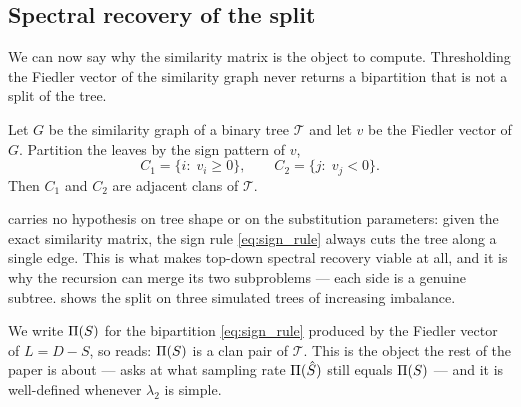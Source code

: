 \subsection{Spectral recovery of the split}\label{sec:model-recovery}

We can now say why the similarity matrix is the object to compute. Thresholding the
Fiedler vector of the similarity graph never returns a bipartition that is not a
split of the tree.

\begin{theorem}\label{thm:stdr-split}
Let $G$ be the similarity graph of a binary tree $\mathcal{T}$ and let $v$ be the
Fiedler vector of $G$. Partition the leaves by the sign pattern of $v$,
\begin{equation}\label{eq:sign_rule}
   C_1=\{i:\;v_i\ge0\},\qquad C_2=\{j:\;v_j<0\}.
\end{equation}
Then $C_1$ and $C_2$ are adjacent clans of $\mathcal{T}$.
\end{theorem}

\noindent {} carries no hypothesis on tree shape or on the
substitution parameters: given the exact similarity matrix, the sign rule
\eqref{eq:sign_rule} always cuts the tree along a single edge. This is what makes
top-down spectral recovery viable at all, and it is why the recursion can merge its
two subproblems --- each side is a genuine subtree.  shows
the split on three simulated trees of increasing imbalance.

We write $\Pi(S)$ for the bipartition \eqref{eq:sign_rule} produced by the Fiedler
vector of $L=D-S$, so  reads: $\Pi(S)$ is a clan pair of
$\mathcal{T}$. This is the object the rest of the paper is about --- 
asks at what sampling rate $\Pi(\hat S)$ still equals $\Pi(S)$ --- and it is
well-defined whenever $\lambda_2$ is simple.

